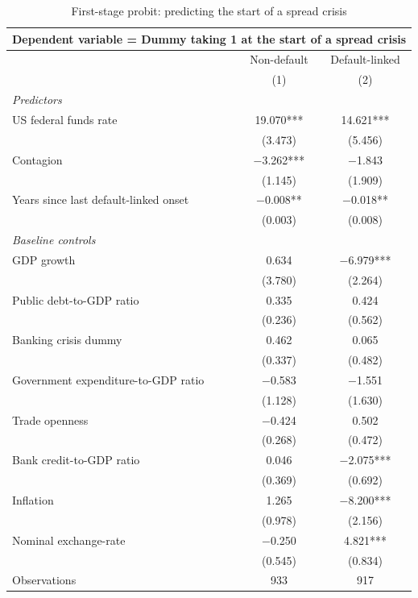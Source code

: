 \documentclass[12pt]{article}
\renewcommand{\arraystretch}{1.25}
\begin{document}
\begin{table}[th]
\centering
\begingroup
\captionsetup{labelsep=newline, labelfont=bf, singlelinecheck=false, justification=raggedright}
\caption{First-stage probit: predicting the start of a spread crisis}
\label{tab:probit}
\endgroup
\footnotesize
\renewcommand{\arraystretch}{1.0}
\begin{tabular}{lcc}
\toprule
\multicolumn{3}{l}{Dependent variable = Dummy taking 1 at the start of a spread crisis} \\
\midrule
 & Non-default & Default-linked \\
 & (1) & (2) \\
\midrule
\multicolumn{3}{l}{\textit{Predictors}} \\[1pt]
US federal funds rate & 19.070*** & 14.621*** \\
 & (3.473) & (5.456) \\[2pt]
Contagion & $-$3.262*** & $-$1.843 \\
 & (1.145) & (1.909) \\[2pt]
Years since last default-linked onset & $-$0.008** & $-$0.018** \\
 & (0.003) & (0.008) \\[4pt]
\multicolumn{3}{l}{\textit{Baseline controls}} \\[1pt]
GDP growth & 0.634 & $-$6.979*** \\
 & (3.780) & (2.264) \\[2pt]
Public debt-to-GDP ratio & 0.335 & 0.424 \\
 & (0.236) & (0.562) \\[2pt]
Banking crisis dummy & 0.462 & 0.065 \\
 & (0.337) & (0.482) \\[2pt]
Government expenditure-to-GDP ratio & $-$0.583 & $-$1.551 \\
 & (1.128) & (1.630) \\[2pt]
Trade openness & $-$0.424 & 0.502 \\
 & (0.268) & (0.472) \\[2pt]
Bank credit-to-GDP ratio & 0.046 & $-$2.075*** \\
 & (0.369) & (0.692) \\[2pt]
Inflation & 1.265 & $-$8.200*** \\
 & (0.978) & (2.156) \\[2pt]
Nominal exchange-rate & $-$0.250 & 4.821*** \\
 & (0.545) & (0.834) \\
\midrule
Observations & 933 & 917 \\

\end{tabular}
\end{table}
\end{document}

